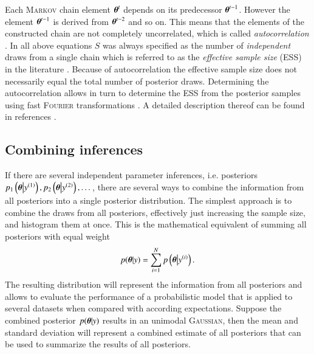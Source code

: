 Each \textsc{Markov} chain element $\boldsymbol{\theta}^t$ depends on its predecessor $\boldsymbol{\theta}^{t-1}$. However the element $\boldsymbol{\theta}^{t-1}$ is derived from $\boldsymbol{\theta}^{t-2}$ and so on. This means that the elements of the constructed chain are not completely uncorrelated, which is called \emph{autocorrelation} \cite{bayes}. In all above equations $S$ was always specified as the number of \emph{independent} draws from a single chain which is referred to as the \emph{effective sample size} (ESS) in the literature \cite{bayes,rhat}. Because of autocorrelation the effective sample size does not necessarily equal the total number of posterior draws. Determining the autocorrelation allows in turn to determine the ESS from the posterior samples using fast \textsc{Fourier} transformations \cite{gey1,gey2}. A detailed description thereof can be found in references \cite{stan,bayes}.
\subsection{Combining inferences}
\label{subsec:combinf}
If there are several independent parameter inferences, i.e. posteriors $p_1\left(\boldsymbol{\theta}\big|y^{(1)}\right),p_2\left(\boldsymbol{\theta}\big|y^{(2)}\right),\dots$, there are several ways to combine the information from all posteriors into a single posterior distribution. The simplest approach is to combine the draws from all posteriors, effectively just increasing the sample size, and histogram them at once. This is the mathematical equivalent of summing all posteriors with equal weight \cite{stone}
\begin{equation}
	p(\boldsymbol{\theta}|y)=\sum_{i=1}^{N}p\left(\boldsymbol{\theta}\big|y^{(i)}\right).
\end{equation}
The resulting distribution will represent the information from all posteriors and allows to evaluate the performance of  a probabilistic model that is applied to several datasets when compared with according expectations. Suppose the combined posterior $p(\boldsymbol{\theta}|y)$ results in an unimodal \textsc{Gaussian}, then the mean and standard deviation will represent a combined estimate of all posteriors that can be used to summarize the results of all posteriors.

